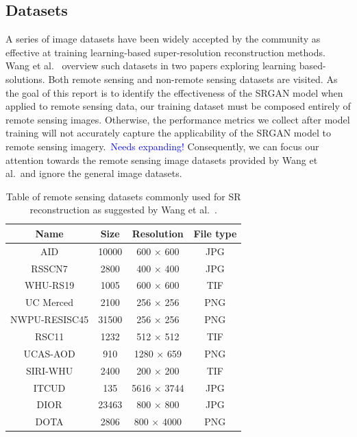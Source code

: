 \subsection{Datasets}
A series of image datasets have been widely accepted by the community as effective at training learning-based super-resolution reconstruction methods. Wang et al.~\cite{remoteSensingDeepLearningReview, remoteSensingGANsReview} overview such datasets in two papers exploring learning based-solutions. Both remote sensing and non-remote sensing datasets are visited. As the goal of this report is to identify the effectiveness of the SRGAN model when applied to remote sensing data, our training dataset must be composed entirely of remote sensing images. Otherwise, the performance metrics we collect after model training will not accurately capture the applicability of the SRGAN model to remote sensing imagery.\ \textcolor{blue}{Needs expanding!} Consequently, we can focus our attention towards the remote sensing image datasets provided by Wang et al.\ and ignore the general image datasets.
\begin{table}
    \centering
    \begin{tabular}{cccc}
        \toprule
        \textbf{Name} & \textbf{Size} & \textbf{Resolution} & \textbf{File type} \\
        \midrule
        AID & 10000 & 600 $\times$ 600 & JPG \\
        RSSCN7 & 2800 & 400 $\times$ 400 & JPG \\
        WHU-RS19 & 1005 & 600 $\times$ 600 & TIF \\
        UC Merced & 2100 & 256 $\times$ 256 & PNG \\
        NWPU-RESISC45 & 31500 & 256 $\times$ 256 & PNG \\
        RSC11 & 1232 & 512 $\times$ 512 & TIF \\
        UCAS-AOD & 910 & 1280 $\times$ 659 & PNG \\
        SIRI-WHU & 2400 & 200 $\times$ 200 & TIF \\
        ITCUD & 135 & 5616 $\times$ 3744 & JPG \\
        DIOR & 23463 & 800 $\times$ 800 & JPG \\
        DOTA & 2806 & 800 $\times$ 4000 & PNG \\
        \bottomrule
    \end{tabular}
    \caption{Table of remote sensing datasets commonly used for SR reconstruction as suggested by Wang et al.~\cite{remoteSensingDeepLearningReview,remoteSensingGANsReview}.}
    \label{table:datasets_table}
\end{table}
